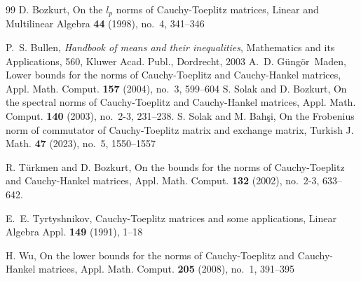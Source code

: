 \documentclass{amsart}
\begin{document}
\begin{thebibliography}{99}
D. Bozkurt, On the $l_p$ norms of Cauchy-Toeplitz matrices, Linear and Multilinear Algebra {\bf 44} (1998), no.~4, 341--346

P.~S. Bullen, {\it Handbook of means and their inequalities}, Mathematics and its Applications, 560, Kluwer Acad. Publ., Dordrecht, 2003
A.~D. G\"ung\"or~Maden, Lower bounds for the norms of Cauchy-Toeplitz and Cauchy-Hankel matrices, Appl. Math. Comput. {\bf 157} (2004), no.~3, 599--604
S. Solak and D. Bozkurt, On the spectral norms of Cauchy-Toeplitz and Cauchy-Hankel matrices, Appl. Math. Comput. {\bf 140} (2003), no.~2-3, 231--238.
S. Solak and M. Bah\c si, On the Frobenius norm of commutator of Cauchy-Toeplitz matrix and exchange matrix, Turkish J. Math. {\bf 47} (2023), no.~5, 1550--1557

R. T\"urkmen and D. Bozkurt, On the bounds for the norms of Cauchy-Toeplitz and Cauchy-Hankel matrices, Appl. Math. Comput. {\bf 132} (2002), no.~2-3, 633--642.

E.~E. Tyrtyshnikov, Cauchy-Toeplitz matrices and some applications, Linear Algebra Appl. {\bf 149} (1991), 1--18

H. Wu, On the lower bounds for the norms of Cauchy-Toeplitz and Cauchy-Hankel matrices, Appl. Math. Comput. {\bf 205} (2008), no.~1, 391--395
\end{thebibliography}
   
\end{document}

